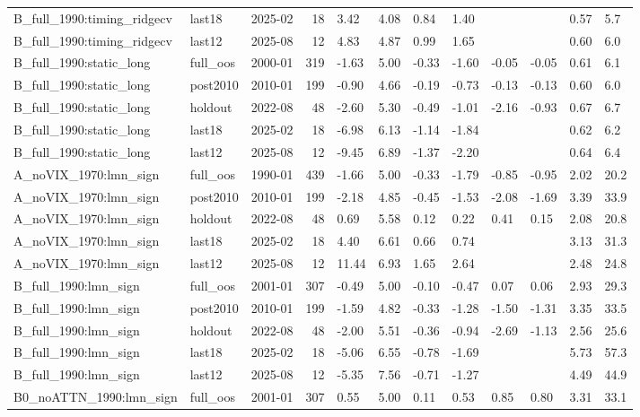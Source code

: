 \begin{table}
\begin{tabular}{lllrllllllll}
B\_full\_1990:timing\_ridgecv & last18 & 2025-02 & 18 & 3.42 & 4.08 & 0.84 & 1.40 &  &  & 0.57 & 5.7 \\
B\_full\_1990:timing\_ridgecv & last12 & 2025-08 & 12 & 4.83 & 4.87 & 0.99 & 1.65 &  &  & 0.60 & 6.0 \\
B\_full\_1990:static\_long & full\_oos & 2000-01 & 319 & -1.63 & 5.00 & -0.33 & -1.60 & -0.05 & -0.05 & 0.61 & 6.1 \\
B\_full\_1990:static\_long & post2010 & 2010-01 & 199 & -0.90 & 4.66 & -0.19 & -0.73 & -0.13 & -0.13 & 0.60 & 6.0 \\
B\_full\_1990:static\_long & holdout & 2022-08 & 48 & -2.60 & 5.30 & -0.49 & -1.01 & -2.16 & -0.93 & 0.67 & 6.7 \\
B\_full\_1990:static\_long & last18 & 2025-02 & 18 & -6.98 & 6.13 & -1.14 & -1.84 &  &  & 0.62 & 6.2 \\
B\_full\_1990:static\_long & last12 & 2025-08 & 12 & -9.45 & 6.89 & -1.37 & -2.20 &  &  & 0.64 & 6.4 \\
A\_noVIX\_1970:lmn\_sign & full\_oos & 1990-01 & 439 & -1.66 & 5.00 & -0.33 & -1.79 & -0.85 & -0.95 & 2.02 & 20.2 \\
A\_noVIX\_1970:lmn\_sign & post2010 & 2010-01 & 199 & -2.18 & 4.85 & -0.45 & -1.53 & -2.08 & -1.69 & 3.39 & 33.9 \\
A\_noVIX\_1970:lmn\_sign & holdout & 2022-08 & 48 & 0.69 & 5.58 & 0.12 & 0.22 & 0.41 & 0.15 & 2.08 & 20.8 \\
A\_noVIX\_1970:lmn\_sign & last18 & 2025-02 & 18 & 4.40 & 6.61 & 0.66 & 0.74 &  &  & 3.13 & 31.3 \\
A\_noVIX\_1970:lmn\_sign & last12 & 2025-08 & 12 & 11.44 & 6.93 & 1.65 & 2.64 &  &  & 2.48 & 24.8 \\
B\_full\_1990:lmn\_sign & full\_oos & 2001-01 & 307 & -0.49 & 5.00 & -0.10 & -0.47 & 0.07 & 0.06 & 2.93 & 29.3 \\
B\_full\_1990:lmn\_sign & post2010 & 2010-01 & 199 & -1.59 & 4.82 & -0.33 & -1.28 & -1.50 & -1.31 & 3.35 & 33.5 \\
B\_full\_1990:lmn\_sign & holdout & 2022-08 & 48 & -2.00 & 5.51 & -0.36 & -0.94 & -2.69 & -1.13 & 2.56 & 25.6 \\
B\_full\_1990:lmn\_sign & last18 & 2025-02 & 18 & -5.06 & 6.55 & -0.78 & -1.69 &  &  & 5.73 & 57.3 \\
B\_full\_1990:lmn\_sign & last12 & 2025-08 & 12 & -5.35 & 7.56 & -0.71 & -1.27 &  &  & 4.49 & 44.9 \\
B0\_noATTN\_1990:lmn\_sign & full\_oos & 2001-01 & 307 & 0.55 & 5.00 & 0.11 & 0.53 & 0.85 & 0.80 & 3.31 & 33.1 \\

\end{tabular}
\end{table}
